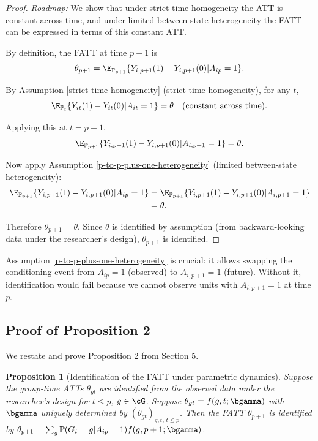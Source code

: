 \documentclass{article}
\newtheorem*{proposition*}{Proposition}
\renewcommand{\P}{\mathbb{P}}
\begin{document}
\begin{proof}
\textit{Roadmap:} We show that under strict time homogeneity the ATT is constant across time, and under limited between-state heterogeneity the FATT can be expressed in terms of this constant ATT.

By definition, the FATT at time $p+1$ is
\[
\theta_{p+1} = \E_{\P_{p+1}}\{Y_{i,p+1}(1) - Y_{i,p+1}(0) | A_{ip} = 1\}.
\]

By Assumption \ref{strict-time-homogeneity} (strict time homogeneity), for any $t$,
\[
\E_{\P_t}\{Y_{it}(1) - Y_{it}(0) | A_{it} = 1\} = \theta \quad \text{(constant across time)}.
\]

Applying this at $t = p+1$,
\[
\E_{\P_{p+1}}\{Y_{i,p+1}(1) - Y_{i,p+1}(0) | A_{i,p+1} = 1\} = \theta.
\]

Now apply Assumption \ref{p-to-p-plus-one-heterogeneity} (limited between-state heterogeneity):
\begin{align*}
\E_{\P_{p+1}}\{Y_{i,p+1}(1) - Y_{i,p+1}(0) | A_{ip} = 1\}
&= \E_{\P_{p+1}}\{Y_{i,p+1}(1) - Y_{i,p+1}(0) | A_{i,p+1} = 1\} \\
&= \theta.
\end{align*}

Therefore $\theta_{p+1} = \theta$. Since $\theta$ is identified by assumption (from backward-looking data under the researcher's design), $\theta_{p+1}$ is identified.
\end{proof}

\begin{remark}
Assumption \ref{p-to-p-plus-one-heterogeneity} is crucial: it allows swapping the conditioning event from $A_{ip} = 1$ (observed) to $A_{i,p+1} = 1$ (future). Without it, identification would fail because we cannot observe units with $A_{i,p+1} = 1$ at time $p$.
\end{remark}

\subsection{Proof of Proposition 2}\label{app:prop2}

We restate and prove Proposition 2 from Section 5.

\begin{proposition*}[Identification of the FATT under parametric dynamics]
Suppose the group-time ATTs $\theta_{gt}$ are identified from the observed data under the researcher's design for $t \leq p$, $g \in \cG$. Suppose $\theta_{gt} = f(g,t;\bgamma)$ with $\bgamma$ uniquely determined by $(\theta_{gt})_{g,t,\, t \leq p}$. Then the FATT $\theta_{p+1}$ is identified by $\theta_{p+1} = \sum_{g}\P(G_i = g | A_{ip} = 1) f(g, p+1; \bgamma)$.
\end{proposition*}
\end{document}
